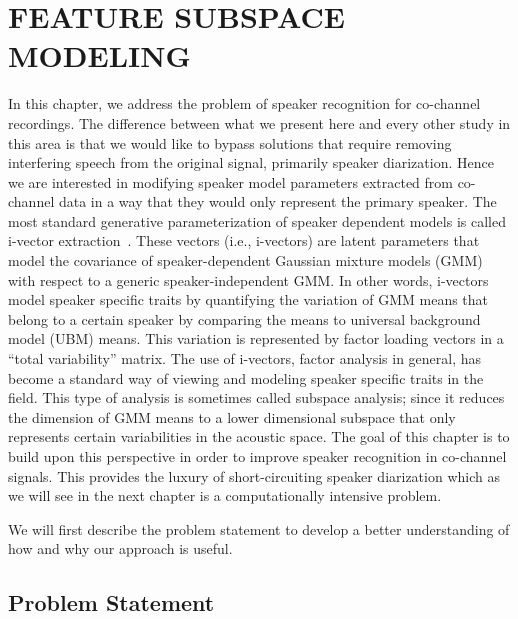 
\chapter{FEATURE SUBSPACE MODELING}

In this chapter, we address the problem of speaker recognition for co-channel recordings. 
The difference between what we present here and every other study in this area is that we would like to bypass solutions that require removing interfering speech from the original signal, primarily speaker diarization. 
Hence we are interested in modifying speaker model parameters extracted from co-channel data in a way that they would only represent the primary speaker. 
The most standard generative parameterization of speaker dependent models is called i-vector extraction~\cite{najeem_frontendanalysis}. 
These vectors (i.e., i-vectors) are latent parameters that model the covariance of speaker-dependent Gaussian mixture models (GMM) with respect to a generic speaker-independent GMM. 
In other words, i-vectors model speaker specific traits by quantifying the variation of GMM means that belong to a certain speaker by comparing the means to universal background model (UBM) means. 
This variation is represented by factor loading vectors in a ``total variability'' matrix. 
The use of i-vectors, factor analysis in general, has become a standard way of viewing and modeling speaker specific traits in the field. 
This type of analysis is sometimes called subspace analysis; since it reduces the dimension of GMM means to a lower dimensional subspace that only represents certain variabilities in the acoustic space. 
The goal of this chapter is to build upon this perspective in order to improve speaker recognition in co-channel signals. 
This provides the luxury of short-circuiting speaker diarization which as we will see in the next chapter is a computationally intensive problem. 

We will first describe the problem statement to develop a better understanding of how and why our approach is useful. 

\section{Problem Statement}

